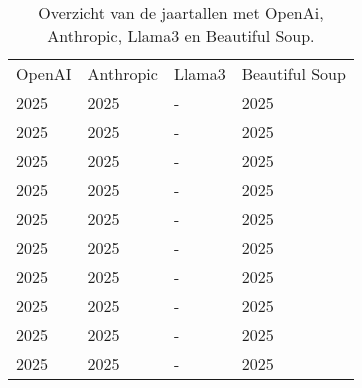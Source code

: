 \begin{table}[h!]
    \tiny
    \caption{Overzicht van de jaartallen met OpenAi, Anthropic, Llama3 en Beautiful Soup.}
    \centering
    \begin{sideways}
    \begin{tabularx}{\textwidth}{|X|X|p{1cm}|X|} 
        \hline
        \rowcolor{lightgray}
        \multicolumn{4}{|X|}{Jaar}\\ 
        \hline
        \rowcolor{lightgray}
        OpenAI & Anthropic & Llama3 & Beautiful Soup \\ 
        \hline
        2025 & 2025 & - & 2025\\ 
        2025 & 2025 & - & 2025\\
        2025 & 2025 & - & 2025\\
        2025 & 2025 & - & 2025\\
        2025 & 2025 & - & 2025\\
        2025 & 2025 & - & 2025\\
        2025 & 2025 & - & 2025\\
        2025 & 2025 & - & 2025\\
        2025 & 2025 & - & 2025\\
        2025 & 2025 & - & 2025\\
        \hline
    \end{tabularx}
\end{sideways}
    \label{table:llmJaar}
\end{table}
